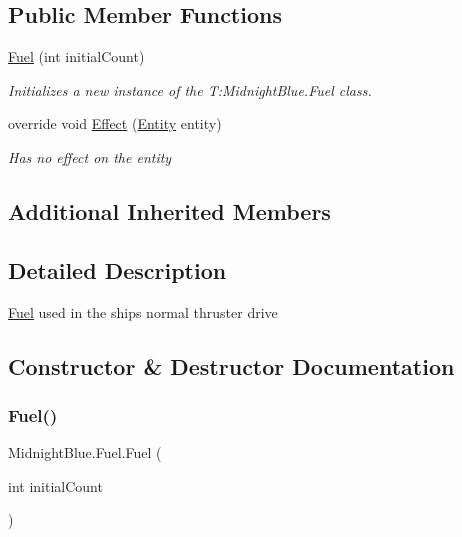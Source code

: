 \subsection*{Public Member Functions}
\begin{DoxyCompactItemize}
\item 
\hyperlink{class_midnight_blue_1_1_fuel_a44747305c7b7d4572d23fd764e568fc1}{Fuel} (int initial\+Count)
\begin{DoxyCompactList}\small\item\em Initializes a new instance of the T\+:\+Midnight\+Blue.\+Fuel class. \end{DoxyCompactList}\item 
override void \hyperlink{class_midnight_blue_1_1_fuel_a9ab52c79211ec8cdcc9389f772615ac0}{Effect} (\hyperlink{class_midnight_blue_1_1_engine_1_1_entity_component_1_1_entity}{Entity} entity)
\begin{DoxyCompactList}\small\item\em Has no effect on the entity \end{DoxyCompactList}\end{DoxyCompactItemize}
\subsection*{Additional Inherited Members}


\subsection{Detailed Description}
\hyperlink{class_midnight_blue_1_1_fuel}{Fuel} used in the ships normal thruster drive 



\subsection{Constructor \& Destructor Documentation}
\hypertarget{class_midnight_blue_1_1_fuel_a44747305c7b7d4572d23fd764e568fc1}{}\label{class_midnight_blue_1_1_fuel_a44747305c7b7d4572d23fd764e568fc1} 
\subsubsection{\texorpdfstring{Fuel()}{Fuel()}}
{\footnotesize\ttfamily Midnight\+Blue.\+Fuel.\+Fuel (\begin{DoxyParamCaption}\item[{int}]{initial\+Count }\end{DoxyParamCaption})\hspace{0.3cm}{\ttfamily [inline]}}



